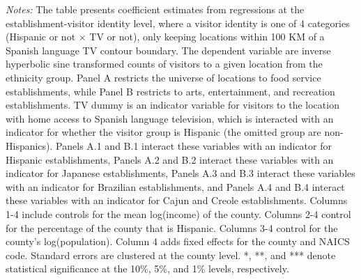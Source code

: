 \begin{table}[!htbp]
{\begin{threeparttable}
\begin{tablenotes}[flushleft]
				\item \textit{Notes:} The table presents coefficient estimates from regressions at the establishment-visitor identity level, where a visitor identity is one of 4 categories (Hispanic or not $\times$ TV or not), only keeping locations within 100 KM of a Spanish language TV contour boundary. The dependent variable are inverse hyperbolic sine transformed counts of visitors to a given location from the ethnicity group. Panel A restricts the universe of locations to food service establishments, while Panel B restricts to arts, entertainment, and recreation establishments. TV dummy is an indicator variable for visitors to the location with home access to Spanish language television, which is interacted with an indicator for whether the visitor group is Hispanic (the omitted group are non-Hispanics). Panels A.1 and B.1 interact these variables with an indicator for Hispanic establishments, Panels A.2 and B.2 interact these variables with an indicator for Japanese establishments, Panels A.3 and B.3 interact these variables with an indicator for Brazilian establishments, and Panels A.4 and B.4 interact these variables with an indicator for Cajun and Creole establishments.   Columns 1-4 include controls for the mean log(income) of the county. Columns 2-4 control for the percentage of the county that is Hispanic. Columns 3-4 control for the county's log(population). Column 4 adds fixed effects for the county and NAICS code. Standard errors are clustered at the county level. *, **, and *** denote statistical significance at the 10\%, 5\%, and 1\% levels, respectively.
			\end{tablenotes}
		\end{threeparttable}
	}
\end{table}